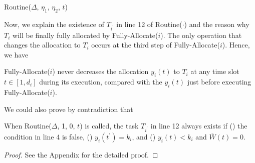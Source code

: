 \documentclass[10pt,journal,compsoc]{IEEEtran}
\newcommand{\rmnum}[1]{\romannumeral #1}
\begin{document}
\begin{algorithm}[!ht]





\caption{Routine($\Delta$, $\eta_{1}$, $\eta_{2}$, $t$)\label{Routine}}
\end{algorithm}






Now, we explain the existence of $T_{i^{\prime}}$ in line 12 of Routine($\cdot$) and the reason why $T_{i}$ will be finally fully allocated by Fully-Allocate($i$). The only operation that changes the allocation to $T_{i}$ occurs at the third step of Fully-Allocate($i$). Hence, we have
\begin{lemma}\label{lemma-decrease}
Fully-Allocate($i$) never decreases the allocation $y_{i}(t)$ to $T_{i}$ at any time slot $t\in [1,d_{i}]$ during its execution, compared with the $y_{i}(t)$ just before executing Fully-Allocate($i$).
\end{lemma}



We could also prove by contradiction that
\begin{lemma}\label{lemma-existence}
When Routine($\Delta$, 1, 0, $t$) is called, the task $T_{i^{\prime}}$ in line 12 always exists if (\rmnum{1}) the condition in line 4 is false, (\rmnum{2}) $y_{i}(t^{\prime})=k_{i}$, and (\rmnum{3}) $y_{i}(t)<k_{i}$ and $\overline{W}(t)=0$.
\end{lemma}
\begin{proof}
See the Appendix for the detailed proof.
\end{proof}
\end{document}
